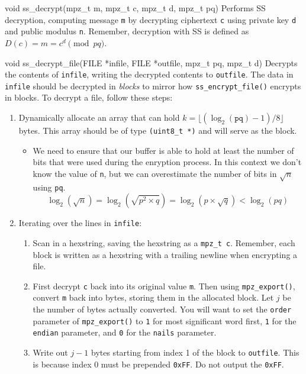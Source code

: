 \begin{funcdoc}{void ss\_decrypt(mpz\_t m, mpz\_t c, mpz\_t d,
mpz\_t pq)}
  Performs SS decryption, computing message \texttt{m} by decrypting
  ciphertext \texttt{c} using private key \texttt{d} and public modulus
  \texttt{n}. Remember, decryption with SS is defined as $D(c) = m =
        c^d \pmod{pq}$.
\end{funcdoc}

\begin{funcdoc}{void ss\_decrypt\_file(FILE *infile, FILE *outfile,
mpz\_t pq, mpz\_t d)}
  Decrypts the contents of \texttt{infile}, writing the decrypted
  contents to \texttt{outfile}. The data in \texttt{infile} should be
  decrypted in \emph{blocks} to mirror how \texttt{ss\_encrypt\_file()}
  encrypts in blocks. To decrypt a file, follow these steps:
  \begin{enumerate}
    \item Dynamically allocate an array that can hold
        $k = \lfloor(\log_2({\texttt{pq}}) - 1) / 8\rfloor$ bytes. This
      array should be of type \texttt{(uint8\_t *)} and will serve as
      the block.
          \begin{itemize}
              \item We need to ensure that our buffer is able to hold at
                  least the number of bits that were used during the
                  enryption process.  In this context we don't know the
                  value of \texttt{n}, but we can overestimate the number
                  of bits in $\sqrt{n}$ using \texttt{pq}.\\
                  \[\log_2(\sqrt{n}) = \log_2(\sqrt{p^2\times q})
                  = \log_2(p\times \sqrt{q}) < \log_2(pq)\]
          \end{itemize}
    \item Iterating over the lines in \texttt{infile}:
      \begin{enumerate}
        \item Scan in a hexstring, saving the hexstring as a
          \texttt{mpz\_t c}. Remember, each block is written as a
          hexstring with a trailing newline when encrypting a file.
        \item First decrypt \texttt{c} back into its original value
          \texttt{m}.  Then using \texttt{mpz\_export()}, convert \texttt{m} back into
          bytes, storing them in the allocated block. Let $j$ be the
          number of bytes actually converted. You will want to set the
          \texttt{order} parameter of \texttt{mpz\_export()} to
          \texttt{1} for most significant word first, \texttt{1} for the
          \texttt{endian} parameter, and \texttt{0} for the
          \texttt{nails} parameter.
        \item Write out $j - 1$ bytes starting from index 1 of the block
          to \texttt{outfile}. This is because index 0 must be prepended
          \texttt{0xFF}. Do not output the \texttt{0xFF}.
      \end{enumerate}
  \end{enumerate}

\end{funcdoc}

